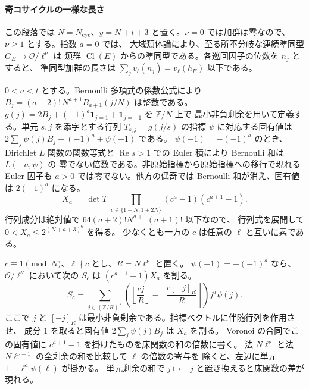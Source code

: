 \paragraph{奇コサイクルの一様な長さ}
この段落では \(N=N_{\mathrm{cyc}}\)、\(y=N+t+3\) と置く。\(\nu=0\) では加群は零なので、\(\nu\ge1\) とする。指数 \(a=0\) では、
大域類体論により、至る所不分岐な連続準同型 \(G_E\to\mathcal O/\ell^\nu\) は
類群 \(\operatorname{Cl}(E)\) からの準同型である。各巡回因子の位数を \(n_j\) とすると、
準同型加群の長さは \(\sum_jv_\ell(n_j)=v_\ell(h_E)\) 以下である。

\(0<a<t\) とする。Bernoulli 多項式の係数公式により
\(B_j=(a+2)!\,N^{a+1}B_{a+1}(j/N)\) は整数である。
\(g(j)=2B_j+(-1)^a\mathbf 1_{j=1}+\mathbf 1_{j=-1}\) を \(\mathbb Z/N\) 上で
最小非負剰余を用いて定義する。単元 \(s,j\) を添字とする行列 \(T_{s,j}=g(j/s)\)
の指標 \(\psi\) に対応する固有値は \(2\sum_j\psi(j)B_j+(-1)^a+\psi(-1)\) である。
\(\psi(-1)=-(-1)^a\) のとき、Dirichlet \(L\) 関数の関数等式と
\(\operatorname{Re}s>1\) での Euler 積により Bernoulli 和は \(L(-a,\psi)\) の
零でない倍数である。非原始指標から原始指標への移行で現れる Euler 因子も \(a>0\)
では零でない。他方の偶奇では Bernoulli 和が消え、固有値は \(2(-1)^a\) になる。
\[
 X_a=|\det T|\prod_{c\in\{1+N,1+2N\}}(c^a-1)(c^{a+1}-1).
\]
行列成分は絶対値で \(64(a+2)!N^{a+1}(a+1)!\) 以下なので、
行列式を展開して \(0<X_a\le2^{(N+a+3)^6}\) を得る。
少なくとも一方の \(c\) は任意の \(\ell\) と互いに素である。

\(c\equiv1\pmod N\)、\(\ell\nmid c\) とし、\(R=N\ell^\nu\) と置く。
\(\psi(-1)=-(-1)^a\) なら、\(\mathcal O/\ell^\nu\) において次の \(S_c\) は
\((c^{a+1}-1)X_a\) を割る。
\[
 S_c=\sum_{j\in(\mathbb Z/R)^\times}
 \left(\left\lfloor\frac{cj}{R}\right\rfloor
       -\left\lfloor\frac{c[-j]_R}{R}\right\rfloor\right)j^a\psi(j).
\]
ここで \(j\) と \([-j]_R\) は最小非負剰余である。指標ベクトルに伴随行列を作用させ、
成分 \(1\) を取ると固有値 \(2\sum_j\psi(j)B_j\) は \(X_a\) を割る。
Voronoi の合同でこの固有値に \(c^{a+1}-1\) を掛けたものを床関数の和の倍数に書く。
法 \(N\ell^\nu\) と法 \(N\ell^{\nu-1}\) の全剰余の和を比較して \(\ell\) の倍数の寄与を
除くと、左辺に単元 \(1-\ell^a\psi(\ell)\) が掛かる。
単元剰余の和で \(j\mapsto-j\) と置き換えると床関数の差が現れる。

